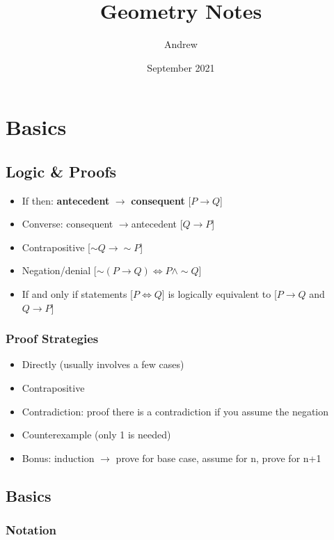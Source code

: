 \documentclass[11pt]{article}
\title{Geometry Notes}
\author{Andrew }
\date{September 2021}
\begin{document}

\section{Basics}
\subsection{Logic \& Proofs}

\begin{itemize}
  \item If then: \textbf{antecedent} $\to$ \textbf{consequent} [$P\to Q$]
  \item Converse: consequent $\to$antecedent [$Q\to P$]
  \item Contrapositive  [$\sim Q\to \sim P$]
  \item Negation/denial [$\sim (P\to Q) \iff P\land \sim Q$]
  \item If and only if statements [$P\iff Q$] is logically equivalent to [$P\to Q$ and $Q\to P$]
\end{itemize}

\subsubsection{Proof Strategies }

\begin{itemize}
  \item Directly (usually involves a few cases)
  \item Contrapositive
  \item Contradiction: proof there is a contradiction if you assume the negation
  \item Counterexample (only 1 is needed)
  \item Bonus: induction $\to$ prove for base case, assume for n, prove for n+1
\end{itemize}

\subsection{Basics}
\subsubsection{Notation}
\end{document}

